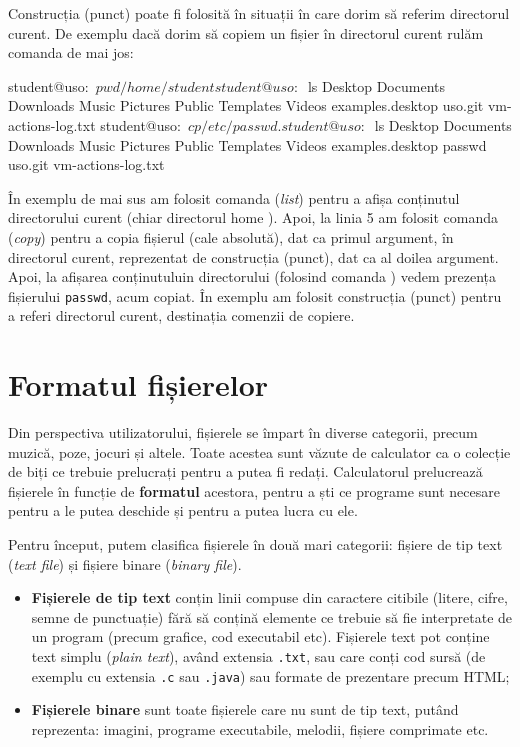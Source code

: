 Construcția  (punct) poate fi folosită în situații în care dorim să referim directorul curent. De exemplu dacă dorim să copiem un fișier în directorul curent rulăm comanda de mai jos:

\begin{screen}
student@uso:~$ pwd
/home/student
student@uso:~$ ls
Desktop  Documents  Downloads  Music  Pictures  Public  Templates  Videos  examples.desktop  uso.git  vm-actions-log.txt
student@uso:~$ cp /etc/passwd .
student@uso:~$ ls
Desktop  Documents  Downloads  Music  Pictures  Public  Templates  Videos  examples.desktop  passwd  uso.git  vm-actions-log.txt
\end{screen}

În exemplu de mai sus am folosit comanda  (\textit{list}) pentru a afișa conținutul directorului curent (chiar directorul home ). Apoi, la linia 5 am folosit comanda  (\textit{copy}) pentru a copia fișierul  (cale absolută), dat ca primul argument, în directorul curent, reprezentat de construcția  (punct), dat ca al doilea argument. Apoi, la afișarea conținutuluin directorului (folosind comanda ) vedem prezența fișierului \texttt{passwd}, acum copiat. În exemplu am folosit construcția  (punct) pentru a referi directorul curent, destinația comenzii de copiere.

\section{Formatul fișierelor}
\label{sec:file-system-format}

Din perspectiva utilizatorului, fișierele se împart în diverse categorii, precum
muzică, poze, jocuri și altele. Toate acestea sunt văzute de calculator ca o
colecție de biți ce trebuie prelucrați pentru a putea fi redați. Calculatorul
prelucrează fișierele în funcție de \textbf{formatul} acestora, pentru a ști ce
programe sunt necesare pentru a le putea deschide și pentru a putea lucra cu
ele.

Pentru început, putem clasifica fișierele în două mari categorii: fișiere de tip
text (\textit{text file}) și fișiere binare (\textit{binary file}).

\begin{itemize}
  \item \textbf{Fișierele de tip text} conțin linii compuse din caractere citibile (litere, cifre, semne de punctuație)
		fără să conțină elemente ce trebuie să fie interpretate de un
		program (precum grafice, cod executabil etc). Fișierele text
		pot conține text simplu (\textit{plain text}), având extensia
                \texttt{.txt}, sau care conți cod sursă (de exemplu cu extensia \texttt{.c} sau \texttt{.java})
		sau formate de prezentare precum HTML;
	\item \textbf{Fișierele binare} sunt toate fișierele care nu sunt de tip
		text, putând reprezenta: imagini, programe executabile, melodii,
		fișiere comprimate etc.
\end{itemize}


